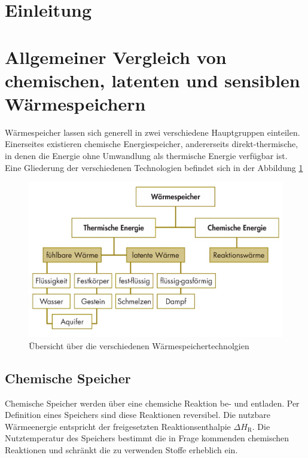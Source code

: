 \documentclass[11pt,a4paper]{scrartcl}
\begin{document}

\tableofcontents
\newpage
\renewcommand{\headrulewidth}{0.4pt}
\renewcommand{\footrulewidth}{0.4pt}
\lhead{}
\rhead{}
\cfoot{}
\setcounter{page}{1}
\cfoot{\thepage}
\section{Einleitung}
\newpage
\section{Allgemeiner Vergleich von chemischen, latenten und sensiblen
Wärmespeichern}
Wärmespeicher lassen sich generell in zwei verschiedene Hauptgruppen einteilen.
Einerseites existieren chemische Energiespeicher, andererseits
direkt-thermische, in denen die Energie ohne Umwandlung als thermische Energie
verfügbar ist. Eine Gliederung der verschiedenen Technologien befindet sich in
der Abbildung
\ref{fig:Wärmespeicher}

\begin{figure}[h]
\begin{center}
\includegraphics[scale=0.3]{images/speicher.jpg}
\caption{Übersicht über die verschiedenen Wärmespeichertechnolgien \cite{BINE}}
\label{fig:Wärmespeicher}
\end{center}
\end{figure}

\subsection{Chemische Speicher}
Chemische Speicher werden über eine chemsiche Reaktion be- und entladen. Per
Definition eines Speichers sind diese Reaktionen reversibel. Die nutzbare
Wärmeenergie entspricht der freigesetzten Reaktionsenthalpie $\Delta
H_{\mathrm{R}}$. Die Nutztemperatur des Speichers bestimmt die in Frage
kommenden chemischen Reaktionen und schränkt die zu verwenden Stoffe erheblich
ein.
\end{document}
